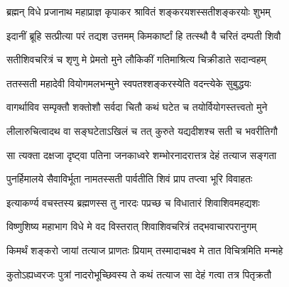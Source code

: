 

\textlink{}

\storymeta


\twolineshloka
{ब्रह्मन् विधे प्रजानाथ महाप्राज्ञ कृपाकर}
{श्रावितं शङ्करयशस्सतीशङ्करयोः शुभम्} %

\twolineshloka
{इदानीं ब्रूहि सत्प्रीत्या परं तद्यश उत्तमम्}
{किमकार्ष्टां हि तत्स्थौ वै चरितं दम्पती शिवौ} %


\twolineshloka
{सतीशिवचरित्रं च शृणु मे प्रेमतो मुने}
{लौकिकीं गतिमाश्रित्य चिक्रीडाते सदान्वहम्} %

\twolineshloka
{ततस्सती महादेवी वियोगमलभन्मुने}
{स्वपतश्शङ्करस्येति वदन्त्येके सुबुद्धयः} %

\twolineshloka
{वागर्थाविव सम्पृक्तौ शक्तोशौ सर्वदा चितौ}
{कथं घटेत च तयोर्वियोगस्तत्त्वतो मुने} %

\twolineshloka
{लीलारुचित्वादथ वा सङ्घटेताऽखिलं च तत्}
{कुरुते यद्यदीशश्च सती च भवरीतिगौ} %

\twolineshloka
{सा त्यक्ता दक्षजा दृष्ट्वा पतिना जनकाध्वरे}
{शम्भोरनादरात्तत्र देहं तत्याज सङ्गता} %

\twolineshloka
{पुनर्हिमालये सैवाविर्भूता नामतस्सती}
{पार्वतीति शिवं प्राप तप्त्वा भूरि विवाहतः} %


\twolineshloka
{इत्याकर्ण्य वचस्तस्य ब्रह्मणस्स तु नारदः}
{पप्रच्छ च विधातारं शिवाशिवमहद्यशः} %


\twolineshloka
{विष्णुशिष्य महाभाग विधे मे वद विस्तरात्}
{शिवाशिवचरित्रं तद्भवाचारपरानुगम्} %

\twolineshloka
{किमर्थं शङ्करो जायां तत्याज प्राणतः प्रियाम्}
{तस्मादाचक्ष्व मे तात विचित्रमिति मन्महे} %

\twolineshloka
{कुतोऽह्यध्वरजः पुत्रां नादरोभूच्छिवस्य ते}
{कथं तत्याज सा देहं गत्वा तत्र पितृक्रतौ} %

